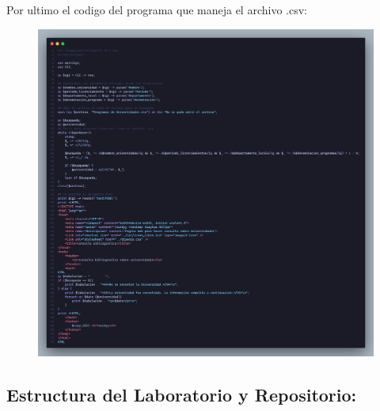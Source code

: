 Por ultimo el codigo del programa que maneja el archivo .csv:
\begin{figure}[h!]
    \centering
    \includegraphics[width=1.2\textwidth,keepaspectratio]{img/Consultar_pl.png}
\end{figure}
\clearpage

\subsection{Estructura del Laboratorio y Repositorio:}

